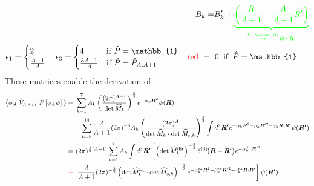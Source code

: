 \documentclass[aps,prd,onecolumn
,tightenlines,letterpaper,
notitlepage,11pt,linenumbers,
nofootinbib]{revtex4-1}
\begin{document}
\begin{align*}
&&&&B_k=&B'_k+\green{\underbrace{\left(\frac{R}{A+1}+\frac{A}{A+1}R'\right)}_{\stackrel{\hat{P}=\mathbb{1}}{\to}R-R'}}\\
&\epsilon_1=
  \begin{cases}
   2             \\
   \frac{A-1}{A} 
  \end{cases}
\epsilon_3=
  \begin{cases}
   4        & \text{if } \hat{P}=\mathbb{1} \\
   \frac{3A-1}{A}        & \text{if } \hat{P}=\hat{P}_{A,A+1}
  \end{cases}  
  &&\multispan3{$\red{\text{red}}~=~0\;\;\text{if}\;\;\hat{P}=\mathbb{1}$\hfil}\\
\end{align*}
\newpage
%
These matrices enable the derivation of
\begin{align}
\big\langle\phi_A\big\vert\hat{V}_\text{\tiny A,A+1}\big\vert\hat{P}\left[\phi_A\psi\right]\big\rangle=&~
\sum_{k=1}^7A_k\left(\frac{(2\pi)^{A-1}}{\det{\widehat{M}}_k}\right)^{\frac{3}{2}}
e^{-\alpha_k\boldsymbol{R}^2}\psi(\boldsymbol{R})\nonumber\\
&~\textcolor{red}{-}\sum_{k=8}^{14}\frac{A}{A+1}(2\pi)^{-3}A_k
\left(\frac{(2\pi)^A}{\det{\widehat{M}}_k\cdot\det{\widehat{M}}_{s,k}}\right)^{\frac{3}{2}}
\int d^3\boldsymbol{R'}e^{-\alpha_k\boldsymbol{R}^2-\beta_k\boldsymbol{R'}^2-\gamma_k\boldsymbol{R}\cdot\boldsymbol{R'}}\psi(\boldsymbol{R'})
\nonumber\\
=&~(2\pi)^{\frac{3}{2}(A-1)}\sum_{k=1}^7A_k\int d^3\boldsymbol{R'}\left[
\left(\det{\widehat{M}}_k^{\text{dir}}\right)^{-\frac{3}{2}}\delta^{(3)}\!\big(\boldsymbol{R}-\boldsymbol{R'}\big)
e^{-\alpha_k^{\text{dir}}\boldsymbol{R'}^2}
\right.\nonumber\\
\textcolor{red}{-}&~\left.
\frac{A}{A+1}(2\pi)^{-\frac{3}{2}}\left(\det{\widehat{M}}_k^{\text{ex}}\cdot
\det{\widehat{M}}_{s,k}\right)^{-\frac{3}{2}}
e^{-\alpha_k^{\text{ex}}\boldsymbol{R}^2-\beta_k^{\text{ex}}\boldsymbol{R'}^2-\gamma_k^{\text{ex}}\boldsymbol{R}\cdot\boldsymbol{R'}}
\right]\psi(\boldsymbol{R'})
\end{align}
%
\end{document}
